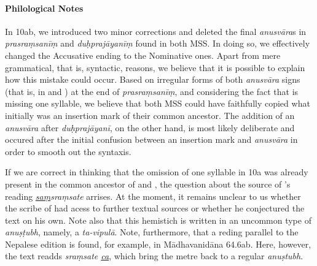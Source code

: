 \paragraph*{Philological Notes}
In 10ab, we introduced two minor corrections and deleted the final 
\emph{anusvāra}s in \emph{prasraṃsanīṃ} and \emph{duḥprajāyanīṃ} found 
in both MSS. In doing so, we effectively changed the Accusative ending to the 
Nominative ones. Apart from mere grammatical, that is, syntactic, reasons, we 
believe that it is possible to explain how this mistake could occur. Based on 
irregular forms of both \emph{anusvāra} signs (that is, in  and ) at the end of \emph{prasraṃsanīṃ}, 
and considering the fact that  is missing one syllable, 
we believe that both MSS could have faithfully copied what initially was an 
insertion mark of their common ancestor. The addition of an \emph{anusvāra} 
after \emph{duḥprajāyanī}, on the other hand, is most likely deliberate and 
occured after the initial confusion between an insertion mark and 
\emph{anusvāra} in order to smooth out the syntaxis.  

If we are correct in thinking that the omission of one syllable in 10a was already 
present in the common ancestor of  and 
, the question about the source of 
's reading \emph{\underline{saṃ}sraṃsate} 
arrises. At the moment, it remains unclear to us whether the scribe of 
 had acess to further textual sources or whether 
he conjectured the text on his own. Note also that this hemistich is written in an 
uncommon type of \emph{anuṣṭubh}, namely, a \emph{ta-vipulā}. Note, 
furthermore, that a reding parallel to the Nepalese edition is found, for example, 
in Mādhavanidāna 64.6ab. Here, however, the text readds \emph{sraṃsate 
\underline{ca}}, which bring the metre back to a regular \emph{anuṣtubh}.  

